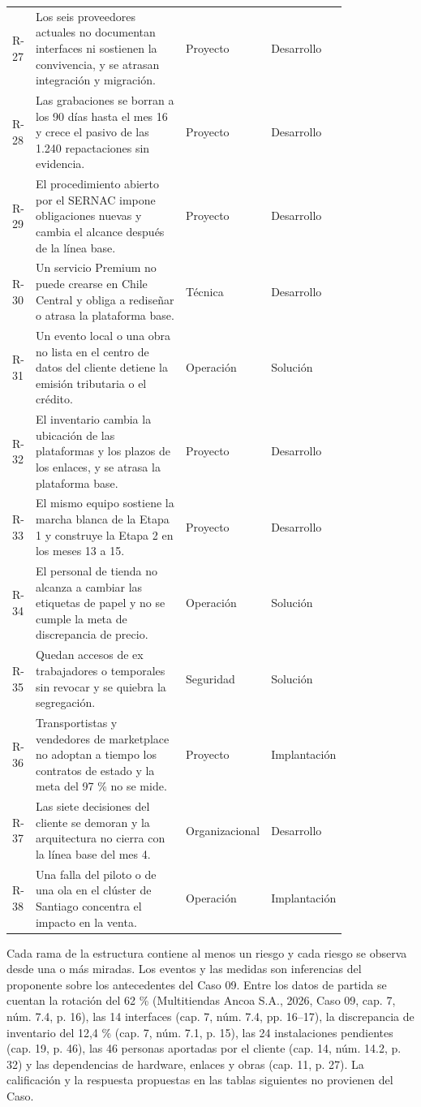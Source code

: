 \documentclass[11pt]{article}
\begin{document}
\begin{longtable}{p{0.060\linewidth}p{0.470\linewidth}p{0.140\linewidth}p{0.150\linewidth}}
R-27 & Los seis proveedores actuales no documentan interfaces ni sostienen la convivencia, y se atrasan integración y migración. & Proyecto & Desarrollo \\
R-28 & Las grabaciones se borran a los 90 días hasta el mes 16 y crece el pasivo de las 1.240 repactaciones sin evidencia. & Proyecto & Desarrollo \\
R-29 & El procedimiento abierto por el SERNAC impone obligaciones nuevas y cambia el alcance después de la línea base. & Proyecto & Desarrollo \\
R-30 & Un servicio Premium no puede crearse en Chile Central y obliga a rediseñar o atrasa la plataforma base. & Técnica & Desarrollo \\
R-31 & Un evento local o una obra no lista en el centro de datos del cliente detiene la emisión tributaria o el crédito. & Operación & Solución \\
R-32 & El inventario cambia la ubicación de las plataformas y los plazos de los enlaces, y se atrasa la plataforma base. & Proyecto & Desarrollo \\
R-33 & El mismo equipo sostiene la marcha blanca de la Etapa 1 y construye la Etapa 2 en los meses 13 a 15. & Proyecto & Desarrollo \\
R-34 & El personal de tienda no alcanza a cambiar las etiquetas de papel y no se cumple la meta de discrepancia de precio. & Operación & Solución \\
R-35 & Quedan accesos de ex trabajadores o temporales sin revocar y se quiebra la segregación. & Seguridad & Solución \\
R-36 & Transportistas y vendedores de marketplace no adoptan a tiempo los contratos de estado y la meta del 97 \% no se mide. & Proyecto & Implantación \\
R-37 & Las siete decisiones del cliente se demoran y la arquitectura no cierra con la línea base del mes 4. & Organizacional & Desarrollo \\
R-38 & Una falla del piloto o de una ola en el clúster de Santiago concentra el impacto en la venta. & Operación & Implantación \\
\end{longtable}

Cada rama de la estructura contiene al menos un riesgo y cada riesgo se observa desde una o más miradas. Los eventos y las medidas son inferencias del proponente sobre los antecedentes del Caso 09. Entre los datos de partida se cuentan la rotación del 62 \% (Multitiendas Ancoa S.A., 2026, Caso 09, cap. 7, núm. 7.4, p. 16), las 14 interfaces (cap. 7, núm. 7.4, pp. 16--17), la discrepancia de inventario del 12,4 \% (cap. 7, núm. 7.1, p. 15), las 24 instalaciones pendientes (cap. 19, p. 46), las 46 personas aportadas por el cliente (cap. 14, núm. 14.2, p. 32) y las dependencias de hardware, enlaces y obras (cap. 11, p. 27). La calificación y la respuesta propuestas en las tablas siguientes no provienen del Caso.
\end{document}
